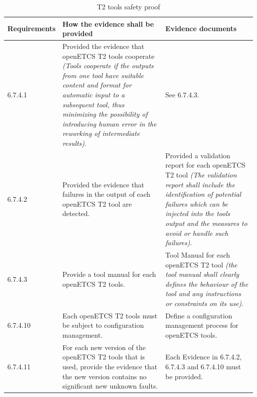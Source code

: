 \documentclass{template/openetcs_report}
\begin{document}
{\footnotesize\sffamily\centering
\begin{longtable}{|p{2cm}|p{9cm}|p{3cm}|}
\caption{T2 tools safety proof}\\
\hline
\bfseries Requirements & \bfseries How the evidence shall be provided & \bfseries Evidence documents\\
\hline
\hline
\endhead
\hline
\endfoot

6.7.4.1 & Provided the evidence that openETCS T2 tools cooperate \linebreak \linebreak \textit{(Tools cooperate if the outputs from one tool have suitable content and format for automatic input to a subsequent tool, thus minimizing the possibility of introducing human error in the reworking of intermediate results)}. & See 6.7.4.3.\\ 
\hline
6.7.4.2 & Provided the evidence that failures in the output of each openETCS T2 tool are detected.& Provided a validation report for each openETCS T2 tool  \linebreak \linebreak \textit{(The validation report shall include the identification of potential failures which can be injected into the tools output and the measures to avoid or handle such failures)}.\\ 
\hline
6.7.4.3 & Provide a tool manual for each openETCS T2 tools. & Tool Manual for each openETCS T2 tool \linebreak \linebreak \textit{(the tool manual shall clearly defines the behaviour of the tool and any instructions or constraints on its use)}.\\ 
\hline
6.7.4.10 & Each openETCS T2 tools must be subject to configuration management. & Define a configuration management process for openETCS tools.\\ 
\hline
6.7.4.11 & For each new version of the openETCS T2 tools that is used, provide the evidence that the new version contains no significant new unknown faults. & Each Evidence in 6.7.4.2, 6.7.4.3 and 6.7.4.10 must be provided.\\ 
\hline
\end{longtable}}
\end{document}

